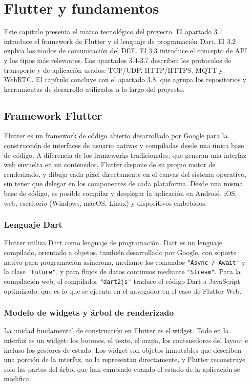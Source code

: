 \chapter{Flutter y fundamentos}
Este capítulo presenta el marco tecnológico del proyecto. El apartado 3.1 introduce el framework de Flutter y el lenguaje de programación Dart. El 3.2 explica los modos de comunicación del DEE. El 3.3 introduce el concepto de API y los tipos más relevantes. Los apartados 3.4-3.7 describen los protocolos de transporte y de aplicación usados: TCP/UDP, HTTP/HTTPS, MQTT y WebRTC. El capítulo concluye con el apartado 3.8, que agrupa los repositorios y herramientas de desarrollo utilizados a lo largo del proyecto.

\section{Framework Flutter}
Flutter es un framework de código abierto desarrollado por Google para la construcción de interfaces de usuario nativas y compiladas desde una única base de código. A diferencia de los frameworks tradicionales, que generan una interfaz web envuelta en un contenedor, Flutter dispone de su propio motor de renderizado, y dibuja cada píxel directamente en el canvas del sistema operativo, sin tener que delegar en los componentes de cada plataforma. Desde una misma base de código, es posible compilar y desplegar la aplicación en Android, iOS, web, escritorio (Windows, macOS, Linux) y dispositivos embebidos.

\subsection{Lenguaje Dart}
Flutter utiliza Dart como lenguaje de programación\cite{dart}. Dart es un lenguaje compilado, orientado a objetos, también desarrollado por Google, con soporte nativo para programación asíncrona, mediante los comandos \texttt{\'"Async / Await"} y la clase \texttt{"Future"}, y para flujos de datos continuos mediante \texttt{"Stream"}. Para la compilación web, el compilador  \texttt{"dart2js"}\cite{dart2js} traduce el código Dart a JavaScript optimizado, que es lo que se ejecuta en el navegador en el caso de Flutter Web.

\subsection{Modelo de widgets y árbol de renderizado}
La unidad fundamental de construcción en Flutter es el widget\cite{flutter_arch}. Todo en la interfaz es un widget: los botones, el texto, el mapa, los contenedores del layout e incluso los gestores de estado. Los widget son objetos inmutables que describen una porción de la interfaz, no la representan directamente, y Flutter reconstruye solo las partes del árbol que han cambiado cuando el estado de la aplicación se modifica.

